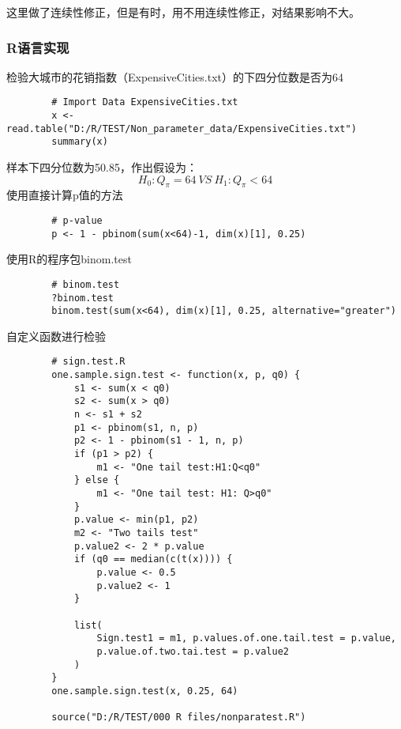 \documentclass[UTF8]{ctexart}
\numberwithin{equation}{section}
\begin{document}
这里做了连续性修正，但是有时，用不用连续性修正，对结果影响不大。

\subsubsection{R语言实现}

检验大城市的花销指数（ExpensiveCities.txt）的下四分位数是否为64
\begin{center}
    \begin{lstlisting}
        # Import Data ExpensiveCities.txt
        x <- read.table("D:/R/TEST/Non_parameter_data/ExpensiveCities.txt")
        summary(x)
    \end{lstlisting}
\end{center}
样本下四分位数为50.85，作出假设为：
\begin{equation}
    H_0:Q_{\pi} = 64 ~ VS ~ H_1: Q_{\pi} < 64
    \nonumber
\end{equation}
使用直接计算p值的方法
\begin{center}
    \begin{lstlisting}
        # p-value
        p <- 1 - pbinom(sum(x<64)-1, dim(x)[1], 0.25)
    \end{lstlisting}
\end{center}
使用R的程序包binom.test
\begin{center}
    \begin{lstlisting}
        # binom.test
        ?binom.test
        binom.test(sum(x<64), dim(x)[1], 0.25, alternative="greater")
    \end{lstlisting}
\end{center}
自定义函数进行检验
\begin{center}
    \begin{lstlisting}
        # sign.test.R
        one.sample.sign.test <- function(x, p, q0) {
            s1 <- sum(x < q0)
            s2 <- sum(x > q0)
            n <- s1 + s2
            p1 <- pbinom(s1, n, p)
            p2 <- 1 - pbinom(s1 - 1, n, p)
            if (p1 > p2) {
                m1 <- "One tail test:H1:Q<q0"
            } else {
                m1 <- "One tail test: H1: Q>q0"
            }
            p.value <- min(p1, p2)
            m2 <- "Two tails test"
            p.value2 <- 2 * p.value
            if (q0 == median(c(t(x)))) {
                p.value <- 0.5
                p.value2 <- 1
            }

            list(
                Sign.test1 = m1, p.values.of.one.tail.test = p.value,
                p.value.of.two.tai.test = p.value2
            )
        }
        one.sample.sign.test(x, 0.25, 64)

        source("D:/R/TEST/000 R files/nonparatest.R")
    \end{lstlisting}
\end{center}
\end{document}
